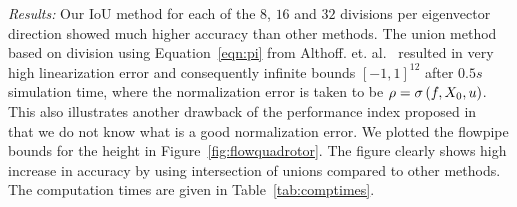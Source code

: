 \emph{Results:}  Our IoU method for each of the $8$, $16$ and $32$ divisions per
  eigenvector direction showed much higher accuracy than other
  methods.  The union method based on division using
  Equation~\ref{eqn:pi} from
  Althoff. et. al.~\cite{althoff2013reachability} resulted in very
  high linearization error and consequently infinite bounds
  $[-1,1]^{12}$ after $0.5 s$ simulation time, where the normalization
  error is taken to be $\rho = \sigma\left(f,X_0,u\right)$.  This also
  illustrates another drawback of the performance index proposed
  in~\cite{althoff2013reachability} that we do not know what is a good
  normalization error.  We plotted the flowpipe bounds for the height
  in Figure~\ref{fig:flowquadrotor}.  The figure clearly shows high
  increase in accuracy by using intersection of unions compared to
  other methods.  The computation times are given in Table~\ref{tab:comptimes}.
%
